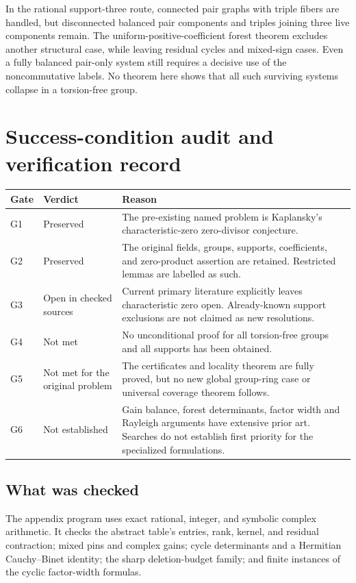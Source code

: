 \documentclass[11pt,a4paper,oneside]{report}
\theoremstyle{definition}
\theoremstyle{remark}
\begin{document}
In the rational support-three route, connected pair graphs with triple fibers are handled, but disconnected balanced pair components and triples joining three live components remain. The uniform-positive-coefficient forest theorem excludes another structural case, while leaving residual cycles and mixed-sign cases. Even a fully balanced pair-only system still requires a decisive use of the noncommutative labels. No theorem here shows that all such surviving systems collapse in a torsion-free group.

\section{Success-condition audit and verification record}
\begin{longtable}{@{}P{.09\linewidth}P{.25\linewidth}P{.59\linewidth}@{}}
\toprule
Gate & Verdict & Reason\\
\midrule\endhead
G1 & Preserved & The pre-existing named problem is Kaplansky's characteristic-zero zero-divisor conjecture.\\[4pt]
G2 & Preserved & The original fields, groups, supports, coefficients, and zero-product assertion are retained. Restricted lemmas are labelled as such.\\[4pt]
G3 & Open in checked sources & Current primary literature explicitly leaves characteristic zero open. Already-known support exclusions are not claimed as new resolutions.\\[4pt]
G4 & Not met & No unconditional proof for all torsion-free groups and all supports has been obtained.\\[4pt]
G5 & Not met for the original problem & The certificates and locality theorem are fully proved, but no new global group-ring case or universal coverage theorem follows.\\[4pt]
G6 & Not established & Gain balance, forest determinants, factor width and Rayleigh arguments have extensive prior art. Searches do not establish first priority for the specialized formulations.\\
\bottomrule
\end{longtable}
\subsection{What was checked}
The appendix program uses exact rational, integer, and symbolic complex arithmetic. It checks the abstract table's entries, rank, kernel, and residual contraction; mixed pins and complex gains; cycle determinants and a Hermitian Cauchy--Binet identity; the sharp deletion-budget family; and finite instances of the cyclic factor-width formulas.
\end{document}
